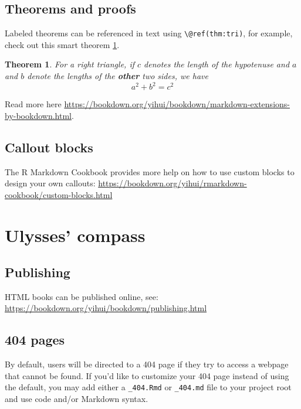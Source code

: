 \documentclass[
]{book}
\newtheorem{theorem}{Theorem}[chapter]
\theoremstyle{definition}
\theoremstyle{definition}
\theoremstyle{definition}
\theoremstyle{definition}
\theoremstyle{remark}
\begin{document}
\hypertarget{theorems-and-proofs}{%
\section{Theorems and proofs}\label{theorems-and-proofs}}

Labeled theorems can be referenced in text using \texttt{\textbackslash{}@ref(thm:tri)}, for example, check out this smart theorem \ref{thm:tri}.

\begin{theorem}
\protect\hypertarget{thm:tri}{}\label{thm:tri}For a right triangle, if \(c\) denotes the \emph{length} of the hypotenuse
and \(a\) and \(b\) denote the lengths of the \textbf{other} two sides, we have
\[a^2 + b^2 = c^2\]
\end{theorem}

Read more here \url{https://bookdown.org/yihui/bookdown/markdown-extensions-by-bookdown.html}.

\hypertarget{callout-blocks}{%
\section{Callout blocks}\label{callout-blocks}}

The R Markdown Cookbook provides more help on how to use custom blocks to design your own callouts: \url{https://bookdown.org/yihui/rmarkdown-cookbook/custom-blocks.html}

\hypertarget{ulysses-compass}{%
\chapter{Ulysses' compass}\label{ulysses-compass}}

\hypertarget{publishing}{%
\section{Publishing}\label{publishing}}

HTML books can be published online, see: \url{https://bookdown.org/yihui/bookdown/publishing.html}

\hypertarget{pages}{%
\section{404 pages}\label{pages}}

By default, users will be directed to a 404 page if they try to access a webpage that cannot be found. If you'd like to customize your 404 page instead of using the default, you may add either a \texttt{\_404.Rmd} or \texttt{\_404.md} file to your project root and use code and/or Markdown syntax.
\end{document}
